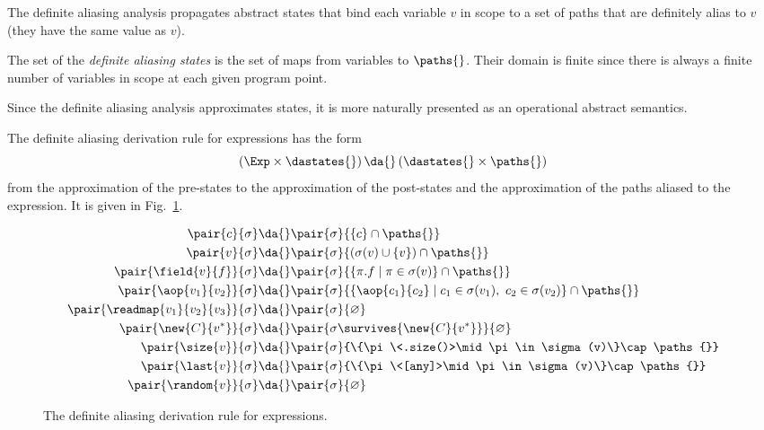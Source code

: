 The definite aliasing analysis propagates abstract states that bind each
variable $v$ in scope to a set of paths that are definitely alias to $v$
(\ieinitial they have the same value as $v$).
%
\begin{definition}\label{def:definite_aliasing_domain}
  The set of the \emph{definite aliasing states} is the set of maps from
  variables to $\paths{}$. Their domain is finite since there is always a finite
  number of variables in scope at each given program point.
\end{definition}
%
Since the definite aliasing analysis approximates states, it is more naturally
presented as an operational abstract semantics.
%
\begin{definition}\label{def:definite_aliasing}
  The definite aliasing derivation rule for expressions has the form
  \[
  \left(\Exp\times\dastates{}\right)\da{}\left(\dastates{}\times\paths{}\right)
  \]
  from the approximation of the pre-states to the approximation of the post-states and
  the approximation of the paths aliased to the expression.
  It is given in Fig.~\ref{fig:daa_expressions}.
%
  \begin{figure}[t]
    \begin{align*}
      \pair{c}{\sigma}&\da{}\pair{\sigma}{\{c\}\cap\paths{}}\\
      \pair{v}{\sigma}&\da{}\pair{\sigma}{(\sigma(v)\cup\{v\})\cap\paths{}}\\
      \pair{\field{v}{f}}{\sigma}&\da{}\pair{\sigma}{\{\pi.f\mid\pi\in\sigma(v)\}\cap\paths{}}\\
      \pair{\aop{v_1}{v_2}}{\sigma}&\da{}\pair{\sigma}{\{\aop{c_1}{c_2}\mid c_1\in\sigma(v_1),\ c_2\in\sigma(v_2)\}\cap\paths{}}\\
      \pair{\readmap{v_1}{v_2}{v_3}}{\sigma}&\da{}\pair{\sigma}{\varnothing}\\
      \pair{\new{C}{v^*}}{\sigma}&\da{}\pair{\sigma\survives{\new{C}{v^*}}}{\varnothing}\\
      \pair{\size{v}}{\sigma}&\da{}\pair{\sigma}{\{\pi\<.size()>\mid\pi\in\sigma(v)\}\cap\paths{}}\\
      \pair{\last{v}}{\sigma}&\da{}\pair{\sigma}{\{\pi\<[any]>\mid\pi\in\sigma(v)\}\cap\paths{}}\\
      \pair{\random{v}}{\sigma}&\da{}\pair{\sigma}{\varnothing}
    \end{align*}
    \caption{The definite aliasing derivation rule for expressions.}
    \label{fig:daa_expressions}
  \end{figure}

\end{definition}

